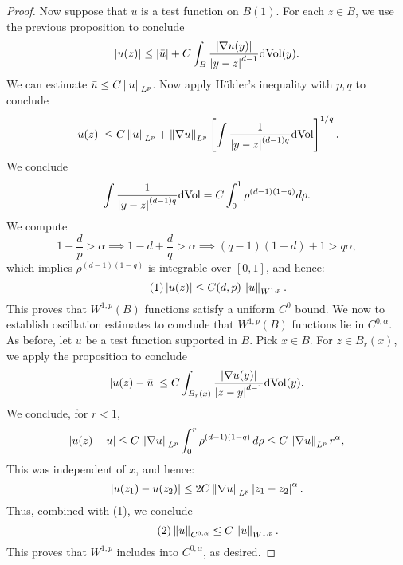 \begin{proof}
  Now suppose that $u$ is a test function on $B(1)$. For each $z\in B$, we use the previous proposition to conclude
  \begin{equation*}
    \left|u(z)\right|\le \left|\bar{u}\right|+C \int_{B}\frac{\left|\nabla u(y)\right|}{\left|y-z\right|^{d-1}}\mathrm{d}\mathrm{Vol}(y).
  \end{equation*}
  We can estimate $\bar{u}\le C\left\lVert u\right\rVert_{L^{p}}$. Now apply H\"older's inequality with $p,q$ to conclude
  \begin{equation*}
    \left|u(z)\right|\le C\left\lVert u\right\rVert_{L^{p}}+\left\lVert\nabla u\right\rVert_{L^{p}}\left[\int \frac{1}{\left|y-z\right|^{(d-1)q}}\mathrm{d}\mathrm{Vol}\right]^{1/q}.
  \end{equation*}
  We conclude
  \begin{equation*}
    \int \frac{1}{\left|y-z\right|^{(d-1)q}}\mathrm{d}\mathrm{Vol}=C\int_{0}^{1}\rho^{(d-1)(1-q)}d\rho.
  \end{equation*}
  We compute
  \begin{equation*}
    1-\frac{d}{p}>\alpha\implies 1-d+\frac{d}{q}>\alpha\implies (q-1)(1-d)+1>q\alpha,
  \end{equation*}
  which implies $\rho^{(d-1)(1-q)}$ is integrable over $[0,1]$, and hence:
  \begin{equation*}\tag{1}
    \left|u(z)\right|\le C(d,p)\left\lVert u\right\rVert_{W^{1,p}}.
  \end{equation*}
  This proves that $W^{1,p}(B)$ functions satisfy a uniform $C^{0}$ bound. We now to establish oscillation estimates to conclude that $W^{1,p}(B)$ functions lie in $C^{0,\alpha}$. As before, let $u$ be a test function supported in $B$. Pick $x\in B$. For $z\in B_{r}(x)$, we apply the proposition to conclude
  \begin{equation*}
    \left|u(z)-\bar{u}\right|\le C\int_{B_{r}(x)}\frac{\left|\nabla u(y)\right|}{\left|z-y\right|^{d-1}}\mathrm{d}\mathrm{Vol}(y).
  \end{equation*}
  We conclude, for $r<1$,
  \begin{equation*}
    \left|u(z)-\bar{u}\right|\le C\left\lVert\nabla u\right\rVert_{L^{p}}\int_{0}^{r}\rho^{(d-1)(1-q)}\,d\rho\le C\left\lVert\nabla u\right\rVert_{L^{p}}r^{\alpha},
  \end{equation*}
  This was independent of $x$, and hence:
  \begin{equation*}
    \left|u(z_{1})-u(z_{2})\right|\le 2C\left\lVert\nabla u\right\rVert_{L^{p}}\left|z_{1}-z_{2}\right|^{\alpha}.
  \end{equation*}
  Thus, combined with (1), we conclude
  \begin{equation*}\tag{2}
    \left\lVert u\right\rVert_{C^{0,\alpha}}\le C\left\lVert u\right\rVert_{W^{1,p}}.
  \end{equation*}
  This proves that $W^{1,p}$ includes into $C^{0,\alpha}$, as desired.  
\end{proof}
